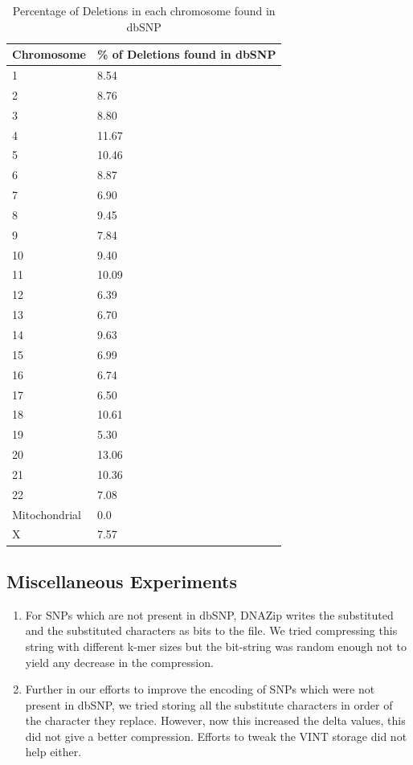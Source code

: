 \documentclass{article}
\begin{document}
\begin{table}[h]
\begin{center}

  	\begin{tabular}{|p{1in}|p{1in}|}
	
	\hline
	Chromosome	&		\% of Deletions found in dbSNP \\
	\hline
	1	&	8.54 \\
	\hline
	2	&	8.76 \\
	\hline
	3	&	8.80 \\
	\hline
	4	&	11.67 \\
	\hline
	5	&	10.46 \\
	\hline
	6	&	8.87 \\
	\hline
	7	&	6.90 \\
	\hline
	8	&	9.45 \\
	\hline
	9	&	7.84 \\
	\hline
	10	&	9.40 \\
	\hline
	11	&	10.09 \\
	\hline
	12	&	6.39 \\
	\hline
	13	&	6.70 \\
	\hline
	14	&	9.63 \\
	\hline
	15	&	6.99 \\
	\hline
	16	&	6.74 \\	
	\hline
	17	&	6.50 \\
	\hline	
	18	&	10.61 \\
	\hline	
	19	&	5.30 \\
	\hline
	20	&	13.06 \\	
	\hline
	21	&	10.36 \\
	\hline
	22	&	7.08  \\
	\hline
	Mitochondrial	&	0.0 \\
	\hline
	X	&	7.57 \\
	\hline
	\end{tabular}
\end{center}
  \caption {Percentage of Deletions in each chromosome found in dbSNP}
  \end{table}


\clearpage

\subsection {Miscellaneous Experiments}

\begin{enumerate}

\item For SNPs which are not present in dbSNP, DNAZip writes the substituted and
the substituted characters as bits to the file. We tried compressing this string
with different k-mer sizes but the bit-string was random enough not to yield any
decrease in the compression.

\item Further in our efforts to improve the encoding of SNPs which were not
present in dbSNP, we tried storing all the substitute characters in order of the
character they replace. However, now this increased the delta values, this did
not give a better compression. Efforts to tweak the VINT storage did not help
either.


\end{enumerate}
\end{document}
